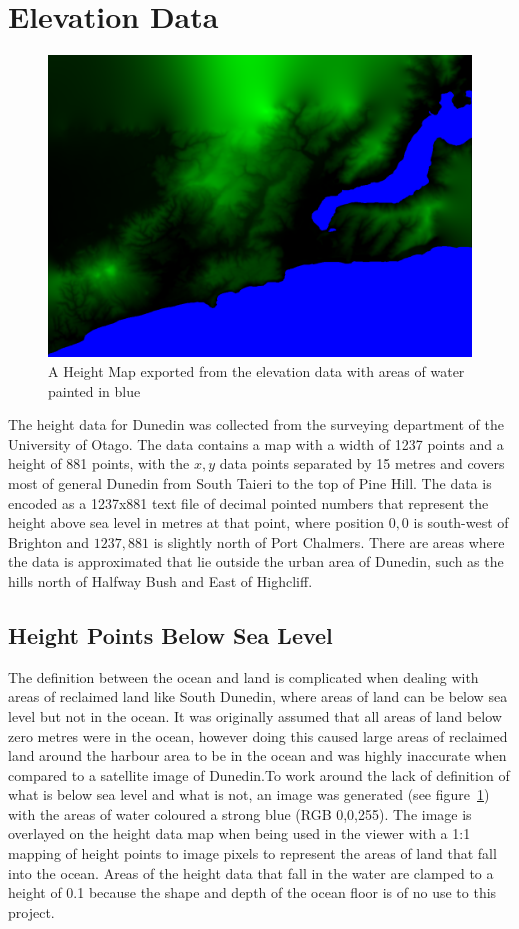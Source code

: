 \documentclass[12pt]{report}
\begin{document}
\section{Elevation Data}

\begin{figure}[h]
\includegraphics[scale=0.25]{heightmapandwater.png}
\caption{A Height Map exported from the elevation data with areas of water painted in blue}
\label{image:elevation-water}
\end{figure}
The height data for Dunedin was collected from the surveying department of the University of Otago. The data contains a map with a width of 1237 points and a height of 881 points, with the $x,y$ data points separated by 15 metres and covers most of general Dunedin from South Taieri to the top of Pine Hill. The data is encoded as a 1237x881 text file of decimal pointed numbers that represent the height above sea level in metres at that point, where position $0,0$ is south-west of Brighton and $1237,881$ is slightly north of Port Chalmers. There are areas where the data is approximated that lie outside the urban area of Dunedin, such as the hills north of Halfway Bush and East of Highcliff.

\subsection{Height Points Below Sea Level}
The definition between the ocean and land is complicated when dealing with areas of reclaimed land like South Dunedin, where areas of land can be below sea level but not in the ocean. It was originally assumed that all areas of land below zero metres were in the ocean, however doing this caused large areas of reclaimed land around the harbour area to be in the ocean and was highly inaccurate when compared to a satellite image of Dunedin\cite{gmaps}.To work around the lack of definition of what is below sea level and what is not, an image was generated (see figure~\ref{image:elevation-water}) with the areas of water coloured a strong blue (RGB 0,0,255). The image is overlayed on the height data map when being used in the viewer with a 1:1 mapping of height points to image pixels to represent the areas of land that fall into the ocean. Areas of the height data that fall in the water are clamped to a height of 0.1 because the shape and depth of the ocean floor is of no use to this project.
\end{document}
